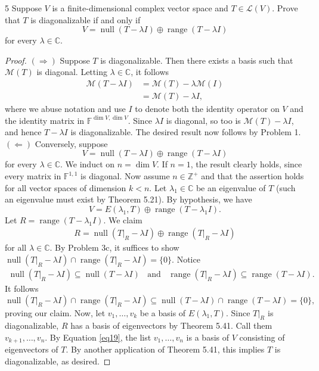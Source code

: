 \documentclass{extarticle}
\newenvironment{problem}[1]{\begin{prob*}{#1}{}}{\end{prob*}}
\newcommand{\Z}{\mathbb{Z}}
\newcommand{\C}{\mathbb{C}}
\newcommand{\F}{\mathbb{F}}
\newcommand{\mat}{\mathcal{M}}
\newcommand{\Hom}{\mathcal{L}}
\DeclareMathOperator{\Null}{null}
\DeclareMathOperator{\Range}{range}
\newcommand{\restr}[1]{|_{#1}}
\begin{document}
\begin{problem}{5}
Suppose $V$ is a finite-dimensional complex vector space and $T\in\Hom(V)$.  Prove that $T$ is diagonalizable if and only if
\begin{equation*}
V = \Null(T - \lambda I)\oplus \Range(T - \lambda I)
\end{equation*}
for every $\lambda\in\C$.
\end{problem}
\begin{proof}
$(\Rightarrow)$  Suppose $T$ is diagonalizable.  Then there exists a basis such that $\mat(T)$ is diagonal.  Letting $\lambda\in\C$, it follows
\begin{align*}
\mat(T - \lambda I) &= \mat(T) -\lambda\mat(I)\\
&= \mat(T) - \lambda I,
\end{align*}
where we abuse notation and use $I$ to denote both the identity operator on $V$ and the identity matrix in $\F^{\dim V,\dim V}$.  Since $\lambda I$ is diagonal, so too is $\mat(T) - \lambda I$, and hence $T - \lambda I$ is diagonalizable.  The desired result now follows by Problem 1.\\
\indent $(\Leftarrow)$ Conversely, suppose 
\begin{equation*}
V = \Null(T - \lambda I)\oplus \Range(T - \lambda I)
\end{equation*}
for every $\lambda\in\C$.  We induct on $n = \dim V$.  If $n = 1$, the result clearly holds, since every matrix in $\F^{1,1}$ is diagonal.  Now assume $n\in\Z^+$ and that the assertion holds for all vector spaces of dimension $k < n$.  Let $\lambda_1\in \C$ be an eigenvalue of $T$ (such an eigenvalue must exist by Theorem 5.21).  By hypothesis, we have
\begin{equation}
V = E(\lambda_1, T)\oplus \Range(T-\lambda_1 I).  \label{eq19}
\end{equation}
Let $R = \Range(T-\lambda_1 I)$.  We claim
\begin{align*}
R = \Null(T\restr{R} - \lambda I) \oplus \Range(T\restr{R}-\lambda I)
\end{align*}
for all $\lambda\in \C$.  By Problem 3c, it suffices to show  $\Null(T\restr{R} - \lambda I) \cap  \Range(T\restr{R} - \lambda I) =\{0\}$.  Notice
\begin{align*}
\Null(T\restr{R} - \lambda I)\subseteq \Null(T - \lambda I)~~~~\text{and}~~~~\Range(T\restr{R} - \lambda I)\subseteq\Range(T - \lambda I).
\end{align*}
It follows
\begin{equation*}
\Null(T\restr{R} - \lambda I) \cap  \Range(T\restr{R} - \lambda I) \subseteq \Null(T - \lambda I) \cap  \Range(T - \lambda I) =\{0\},
\end{equation*}
proving our claim.  Now, let $v_1,\dots, v_k$ be a basis of $E(\lambda_1, T)$.  Since $T\restr{R}$ is diagonalizable, $R$ has a basis of eigenvectors by Theorem 5.41.  Call them $v_{k+1},\dots, v_n$.  By Equation \ref{eq19}, the list $v_1,\dots, v_n$ is a basis of $V$ consisting of eigenvectors of $T$.  By another application of Theorem 5.41, this implies $T$ is diagonalizable, as desired.
\end{proof}
\end{document}
